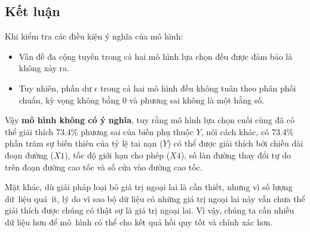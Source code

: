 \subsection*{Kết luận}

Khi kiểm tra các điều kiện ý nghĩa của mô hình:
\begin{itemize}
	\item Vấn đề đa cộng tuyến trong cả hai mô hình lựa chọn đều được đảm bảo là không xảy ra.
	\item Tuy nhiên, phần dư $\epsilon$ trong cả hai mô hình đều không tuân theo phân phối chuẩn, kỳ vọng không bằng 0 và phương sai không là một hằng số.
\end{itemize}

Vậy \textbf{mô hình không có ý nghĩa}, tuy rằng mô hình lựa chọn cuối cùng đã có thể giải thích 73.4\% phương sai của biến phụ thuộc $Y$, nói cách khác, có 73.4\% phần trăm sự biến thiên của tỷ lệ tai nạn ($Y$) có thể được giải thích bởi chiều dài đoạn đường ($X1$), tốc độ giới hạn cho phép ($X4$), số làn đường thay đổi tự do trên đoạn đường cao tốc và số cửa vào đường cao tốc.

Mặt khác, dù giải pháp loại bỏ giá trị ngoại lai là cần thiết, nhưng vì số lượng dữ~liệu quá~ít, lý do vì sao bộ dữ liệu có những giá trị ngoại lai này vẫn chưa thể giải thích được chúng có thật sự là giá trị ngoại lai. Vì vậy, chúng ta cần nhiều dữ liệu hơn để mô~hình có thể cho kết quả hồi quy tốt và chính xác hơn.